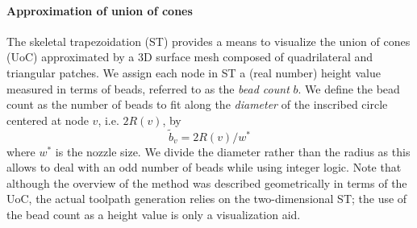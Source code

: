 


\paragraph{Approximation of union of cones}
The skeletal trapezoidation (ST) provides a means to visualize the union of cones (UoC) approximated by a 3D surface mesh composed of quadrilateral and triangular patches.
We assign each node in ST a (real number) height value measured in terms of beads, referred to as the \emph{bead count} $b$.
We define the bead count as the number of beads to fit along the \emph{diameter} of the inscribed circle centered at node $v$, i.e. $2R(v)$, by
\begin{equation}
    \tilde{b}_v = 2 R(v) / w^*
\label{eq:initialBeadCount}
\end{equation}
where $w^*$ is the nozzle size. 
We divide the diameter rather than the radius as this allows to deal with an odd number of beads while using integer logic.
Note that although the overview of the method was described geometrically in terms of the UoC, the actual toolpath generation relies on the two-dimensional ST;
the use of the bead count as a height value is only a visualization aid.







